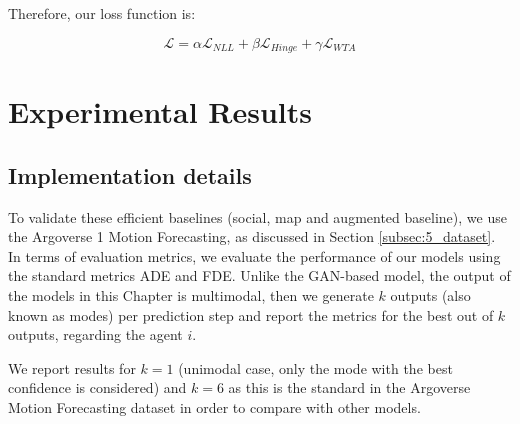 Therefore, our loss function is:

\begin{equation}
	\mathcal{L} = \alpha \mathcal{L}_{NLL} + \beta \mathcal{L}_{Hinge} + \gamma \mathcal{L}_{WTA}
	\label{eq:loss}
\end{equation}

\section{Experimental Results}
\label{sec:6_experimental_results}

\subsection{Implementation details}
\label{subsec:6_implementation_details}

To validate these efficient baselines (social, map and augmented baseline), we use the Argoverse 1 Motion Forecasting, as discussed in Section \ref{subsec:5_dataset}. In terms of evaluation metrics, we evaluate the performance of our models using the standard metrics \ac{ADE} and \ac{FDE}. Unlike the GAN-based model, the output of the models in this Chapter is multimodal, then we generate $k$ outputs (also known as modes) per prediction step and report the metrics for the best out of $k$ outputs, regarding the agent $i$.

We report results for $k=1$ (unimodal case, only the mode with the best confidence is considered) and $k=6$ as this is the standard in the Argoverse Motion Forecasting dataset in order to compare with other models.

